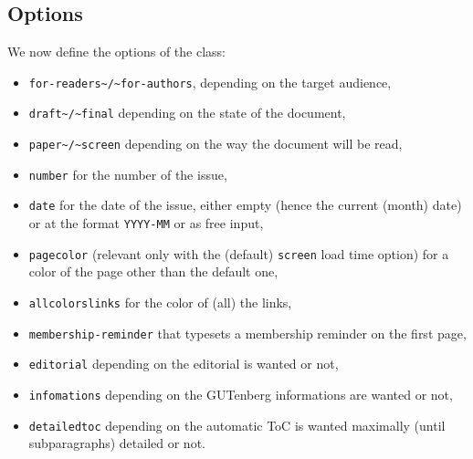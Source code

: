 \documentclass{letgut}
\begin{document}
\subsection{Options}
\label{sec:orgc4ef889}

We now define the options of the class:

\begin{itemize}
\item \lstinline+for-readers~/~for-authors+, depending on the target audience,
\item \lstinline+draft~/~final+ depending on the state of the document,
\item \lstinline+paper~/~screen+ depending on the way the document will be read,
\item \lstinline+number+ for the number of the issue,
\item \lstinline+date+ for the date of the issue, either empty (hence the current (month)
date) or at the format \lstinline+YYYY-MM+ or as free input,
\item \lstinline+pagecolor+ (relevant only with the (default) \lstinline+screen+ load time option) for
a color of the page other than the default one,
\item \lstinline+allcolorslinks+ for the color of (all) the links,
\item \lstinline+membership-reminder+ that typesets a membership reminder on the first page,
\item \lstinline+editorial+ depending on the editorial is wanted or not,
\item \lstinline+infomations+ depending on the GUTenberg informations are wanted or not,
\item \lstinline+detailedtoc+ depending on the automatic ToC is wanted maximally (until
subparagraphs) detailed or not.
\end{itemize}
\end{document}
